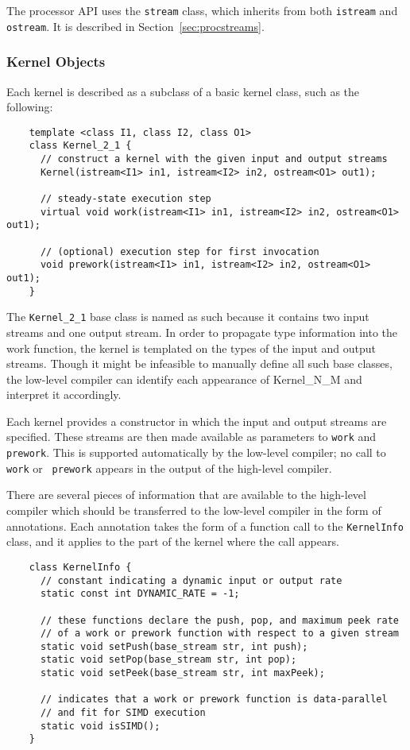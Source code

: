 The processor API uses the {\tt stream} class, which inherits from
both {\tt istream} and {\tt ostream}. It is described in
Section~\ref{sec:procstreams}.

\subsubsection{Kernel Objects}
\label{sec:kernels}

Each kernel is described as a subclass of a basic kernel class, such
as the following:
{\small
\begin{verbatim}
    template <class I1, class I2, class O1>
    class Kernel_2_1 {
      // construct a kernel with the given input and output streams
      Kernel(istream<I1> in1, istream<I2> in2, ostream<O1> out1);

      // steady-state execution step
      virtual void work(istream<I1> in1, istream<I2> in2, ostream<O1> out1);

      // (optional) execution step for first invocation
      void prework(istream<I1> in1, istream<I2> in2, ostream<O1> out1);
    }  
\end{verbatim}}

The {\tt Kernel\_2\_1} base class is named as such because it contains
two input streams and one output stream.  In order to propagate type
information into the work function, the kernel is templated on the
types of the input and output streams.  Though it might be infeasible
to manually define all such base classes, the low-level compiler can
identify each appearance of Kernel\_N\_M and interpret it accordingly.

Each kernel provides a constructor in which the input and output
streams are specified.  These streams are then made available as
parameters to {\tt work} and {\tt prework}.  This is supported
automatically by the low-level compiler; no call to {\tt work} or {\tt
prework} appears in the output of the high-level compiler.


There are several pieces of information that are available to the
high-level compiler which should be transferred to the low-level
compiler in the form of annotations.  Each annotation takes the form
of a function call to the {\tt KernelInfo} class, and it applies to
the part of the kernel where the call appears.
{\small
\begin{verbatim}
    class KernelInfo {
      // constant indicating a dynamic input or output rate
      static const int DYNAMIC_RATE = -1;

      // these functions declare the push, pop, and maximum peek rate
      // of a work or prework function with respect to a given stream
      static void setPush(base_stream str, int push);
      static void setPop(base_stream str, int pop);
      static void setPeek(base_stream str, int maxPeek);

      // indicates that a work or prework function is data-parallel 
      // and fit for SIMD execution
      static void isSIMD();
    }  
\end{verbatim}}

